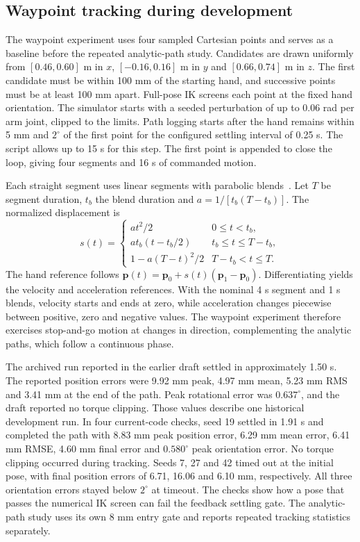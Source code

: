 \documentclass[12pt,a4paper]{article}
\begin{document}
\subsection{Waypoint tracking during development}
The waypoint experiment uses four sampled Cartesian points and serves as a baseline before the repeated analytic-path study. Candidates are drawn uniformly from $[0.46,0.60]$ m in $x$, $[-0.16,0.16]$ m in $y$ and $[0.66,0.74]$ m in $z$. The first candidate must be within 100 mm of the starting hand, and successive points must be at least 100 mm apart. Full-pose IK screens each point at the fixed hand orientation. The simulator starts with a seeded perturbation of up to 0.06 rad per arm joint, clipped to the limits. Path logging starts after the hand remains within 5 mm and $2^\circ$ of the first point for the configured settling interval of 0.25 s. The script allows up to 15 s for this step. The first point is appended to close the loop, giving four segments and 16 s of commanded motion.

Each straight segment uses linear segments with parabolic blends~\cite{siciliano2009}. Let $T$ be segment duration, $t_b$ the blend duration and $a=1/[t_b(T-t_b)]$. The normalized displacement is
\[
s(t)=
\begin{cases}
at^2/2 & 0\le t<t_b,\\
at_b(t-t_b/2) & t_b\le t\le T-t_b,\\
1-a(T-t)^2/2 & T-t_b<t\le T.
\end{cases}
\]
The hand reference follows $\bm p(t)=\bm p_0+s(t)(\bm p_1-\bm p_0)$. Differentiating yields the velocity and acceleration references. With the nominal 4 s segment and 1 s blends, velocity starts and ends at zero, while acceleration changes piecewise between positive, zero and negative values. The waypoint experiment therefore exercises stop-and-go motion at changes in direction, complementing the analytic paths, which follow a continuous phase.

The archived run reported in the earlier draft settled in approximately 1.50 s. The reported position errors were 9.92 mm peak, 4.97 mm mean, 5.23 mm RMS and 3.41 mm at the end of the path. Peak rotational error was $0.637^\circ$, and the draft reported no torque clipping. Those values describe one historical development run. In four current-code checks, seed 19 settled in 1.91 s and completed the path with 8.83 mm peak position error, 6.29 mm mean error, 6.41 mm RMSE, 4.60 mm final error and $0.580^\circ$ peak orientation error. No torque clipping occurred during tracking. Seeds 7, 27 and 42 timed out at the initial pose, with final position errors of 6.71, 16.06 and 6.10 mm, respectively. All three orientation errors stayed below $2^\circ$ at timeout. The checks show how a pose that passes the numerical IK screen can fail the feedback settling gate. The analytic-path study uses its own 8 mm entry gate and reports repeated tracking statistics separately.
\end{document}
